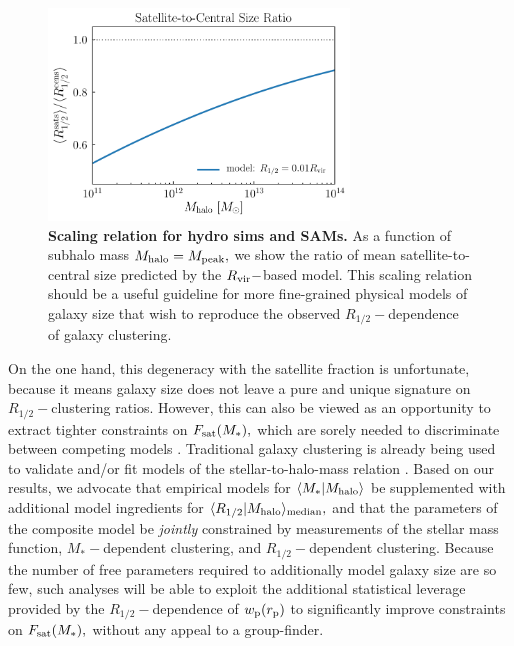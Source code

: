 \documentclass[usenatbib,usegraphicx,letterpaper]{mn2e}
\newcommand{\rhalf}{R_{1/2}}
\newcommand{\mstar}{M_{\ast}}
\newcommand{\mpeak}{M_{\rm peak}}
\newcommand{\mhalo}{M_{\rm halo}}
\newcommand{\rvir}{R_{\rm vir}}
\newcommand{\rproj}{r_{\rm p}}
\newcommand{\wproj}{w_{\rm p}}
\newcommand{\mean}[2]{\langle{#1}\vert{#2}\rangle}
\newcommand{\median}[2]{\langle{#1}\vert{#2}\rangle_{\rm median}}
\begin{document}
\begin{figure}
\centering
\includegraphics[width=8cm]{FIGS/cen_sat_size_ratios.pdf}
\caption{
{\bf Scaling relation for hydro sims and SAMs.}
As a function of subhalo mass $\mhalo=\mpeak,$ we show the ratio of mean satellite-to-central size predicted by the $\rvir-$based model. This scaling relation should be a useful guideline for more fine-grained physical models of galaxy size that wish to reproduce the observed $\rhalf-$dependence of galaxy clustering.
}
\label{fig:censatsizeratios}
\end{figure}

On the one hand, this degeneracy with the satellite fraction is unfortunate, because it means galaxy size does not leave a pure and unique signature on $\rhalf-$clustering ratios. However, this can also be viewed as an opportunity to extract tighter constraints on $F_{\rm sat}(\mstar),$ which are sorely needed to discriminate between competing models \citep{watson_conroy13}. Traditional galaxy clustering is already being used to validate and/or fit models of the stellar-to-halo-mass relation \citep[e.g.,][]{leauthaud_etal11,moster_etal13,behroozi13_smhm,lehmann_etal15}. Based on our results, we advocate that empirical models for $\mean{\mstar}{\mhalo}$ be supplemented with additional model ingredients for $\median{\rhalf}{\mhalo},$ and that the parameters of the composite model be {\em jointly} constrained by measurements of the stellar mass function, $\mstar-$dependent clustering, and $\rhalf-$dependent clustering. Because the number of free parameters required to additionally model galaxy size are so few, such analyses will be able to exploit the additional statistical leverage provided by the $\rhalf-$dependence of $\wproj(\rproj)$ to significantly improve constraints on $F_{\rm sat}(\mstar),$ without any appeal to a group-finder.  
\end{document}
